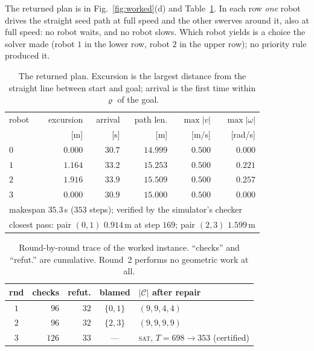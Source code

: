 \documentclass[conference]{IEEEtran}
\theoremstyle{plain}
\theoremstyle{definition}
\newcommand{\Cand}{\mathcal{C}}
\begin{document}
The returned plan is in Fig.~\ref{fig:worked}(d) and Table~\ref{tab:result}. In each row
\emph{one} robot drives the straight seed path at full speed and the other swerves around it,
also at full speed: no robot waits, and no robot slows. Which robot yields is a choice the
solver made (robot $1$ in the lower row, robot $2$ in the upper row); no priority rule
produced it.

\begin{table}[t]
\caption{The returned plan. Excursion is the largest distance from the straight line between
start and goal; arrival is the first time within $\varrho$ of the goal.}
\label{tab:result}
\centering
\small
\begin{tabular}{lrrrrr}
\toprule
robot & excursion & arrival & path len. & $\max|v|$ & $\max|\omega|$ \\
      & [m] & [s] & [m] & [m/s] & [rad/s] \\
\midrule
$0$ & $0.000$ & $30.7$ & $14.999$ & $0.500$ & $0.000$ \\
$1$ & $1.164$ & $33.2$ & $15.253$ & $0.500$ & $0.221$ \\
$2$ & $1.916$ & $33.9$ & $15.509$ & $0.500$ & $0.257$ \\
$3$ & $0.000$ & $30.9$ & $15.000$ & $0.500$ & $0.000$ \\
\midrule
\multicolumn{6}{l}{makespan $35.3$\,s ($353$ steps); verified by the simulator's checker}\\
\multicolumn{6}{l}{closest pass: pair $(0,1)$ $0.914$\,m at step $169$; pair $(2,3)$ $1.599$\,m}\\
\bottomrule
\end{tabular}
\end{table}

\begin{table}[t]
\caption{Round-by-round trace of the worked instance. ``checks'' and ``refut.'' are
cumulative. Round~2 performs no geometric work at all.}
\label{tab:rounds}
\centering
\small
\setlength{\tabcolsep}{4pt}
\begin{tabular}{crrcl}
\toprule
rnd & checks & refut. & blamed & $|\Cand|$ after repair \\
\midrule
$1$ & $96$  & $32$ & $\{0,1\}$ & $(9,9,4,4)$ \\
$2$ & $96$  & $32$ & $\{2,3\}$ & $(9,9,9,9)$ \\
$3$ & $126$ & $33$ & --- & \textsc{sat}, $T\!=\!698 \rightarrow 353$ (certified) \\
\bottomrule
\end{tabular}
\end{table}
\end{document}

